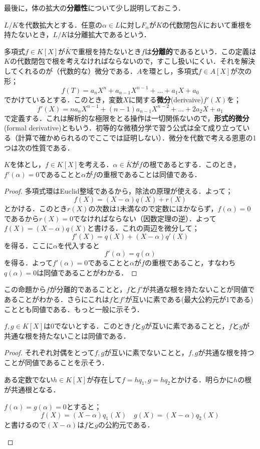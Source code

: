 最後に，体の拡大の\textbf{分離性}について少し説明しておこう．

\begin{defi}[分離拡大]
	$L/K$を代数拡大とする．任意の$\alpha\in L$に対し$F_\alpha$が$K$の代数閉包$\bar{K}$において重根を持たないとき，$L/K$は分離拡大であるという．
\end{defi}

多項式$f\in K[X]$が$\bar{K}$で重根を持たないとき$f$は\textbf{分離的}であるという．この定義は$K$の代数閉包で根を考えなければならないので，すこし扱いにくい．それを解決してくれるのが（代数的な）微分である．$A$を環とし，多項式$f\in A[X]$が次の形；
\[f(T)=a_nX^n+a_{n-1}X^{n-1}+\dots+a_1X+a_0\]
でかけているとする．このとき，変数$X$に関する\textbf{微分}(derivaive)$f'(X)$を；
\[f'(X)=na_nX^{n-1}+(n-1)a_{n-1}X^{n-2}+\dots+2a_2X+a_1\]
で定義する．これは解析的な極限をとる操作は一切関係ないので，\textbf{形式的微分}(formal derivative)ともいう．初等的な微積分学で習う公式は全て成り立っている（計算で確かめられるのでここでは証明しない）．微分を代数で考える恩恵の1つは次の性質である．

\begin{prop}
	$K$を体とし，$f\in K[X]$を考える．$\alpha\in\bar{K}$が$f$の根であるとする．このとき，$f'(\alpha)=0$であることと$\alpha$が$f$の重根であることは同値である．
\end{prop}
\begin{proof}
	多項式環はEuclid整域であるから，除法の原理が使える．よって；
	\[f(X)=(X-\alpha)q(X)+r(X)\]
	とかける．このとき$r(X)$の次数は$1$未満なので定数にほかならず，$f(\alpha)=0$であるから$r(X)=0$でなければならない（因数定理の逆）．よって$f(X)=(X-\alpha)q(X)$と書ける．これの両辺を微分して；
	\[f'(X)=q(X)+(X-\alpha)q'(X)\]
	を得る．ここに$\alpha$を代入すると
	\[f'(\alpha)=q(\alpha)\]
	を得る．よって$f'(\alpha)=0$であることと$\alpha$が$f$の重根であること，すなわち$q(\alpha)=0$は同値であることがわかる．
\end{proof}

この命題から$f$が分離的であることと，$f$と$f'$が共通な根を持たないことが同値であることがわかる．さらにこれは$f$と$f'$が互いに素である(最大公約元が1である)こととも同値である．もっと一般に示そう．
\begin{prop}
	$f,g\in K[X]$は0でないとする．このとき$f$と$g$が互いに素であることと，$f$と$g$が共通な根を持たないことは同値である．
\end{prop}

\begin{proof}
	それぞれ対偶をとって$f,g$が互いに素でないことと，$f,g$が共通な根を持つことが同値であることを示そう．
	\begin{eqv}
		\item 
		ある定数でない$h\in K[X]$が存在して$f=hq_1, g=hq_2$とかける．明らかに$h$の根が共通根となる．
		\item 
		$f(\alpha)=g(\alpha)=0$とすると；
		\[f(X)=(X-\alpha)q_1(X)\quad g(X)=(X-\alpha)q_2(X)\]
		と書けるので$(X-\alpha)$は$f$と$g$の公約元である．
	\end{eqv}
\end{proof}


